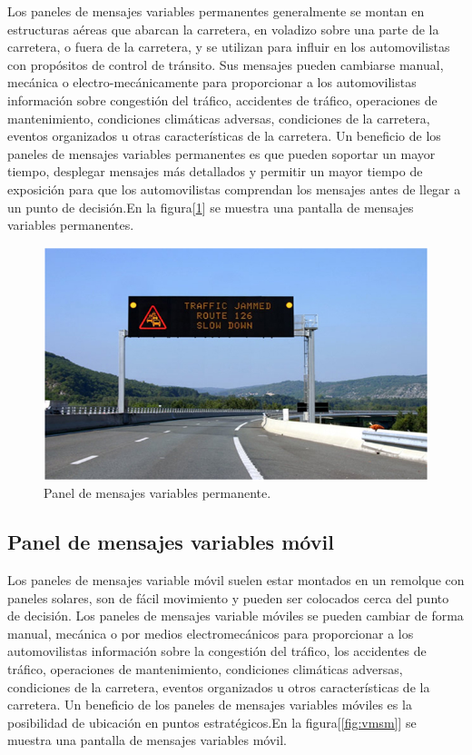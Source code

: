 Los paneles de mensajes variables permanentes generalmente se montan en estructuras aéreas que abarcan la carretera, en voladizo sobre una parte de la carretera, o fuera de la carretera, y se utilizan para influir en los automovilistas con propósitos de control de tránsito. Sus mensajes pueden cambiarse manual, mecánica o electro-mecánicamente para proporcionar a los automovilistas información sobre congestión del tráfico, accidentes de tráfico, operaciones de mantenimiento, condiciones climáticas adversas, condiciones de la carretera, eventos organizados u otras características de la carretera. Un beneficio de los paneles de mensajes variables permanentes es que pueden soportar un mayor tiempo, desplegar mensajes más detallados y permitir un mayor tiempo de exposición para que los automovilistas comprendan los mensajes antes de llegar a un punto de decisión.En la figura[\ref{fig:vmsp}] se muestra una pantalla de mensajes variables permanentes.


\begin{figure}[hptb]
	\centering
	\includegraphics[scale=0.6]{../Figures/vmspermanente.jpg} 
	\caption{Panel de mensajes variables permanente.}
	\label{fig:vmsp}
\end{figure}




\subsection{Panel de mensajes variables móvil}

Los paneles de mensajes variable móvil suelen estar montados en un remolque con paneles solares, son de fácil movimiento y pueden ser colocados cerca del punto de decisión. Los paneles de mensajes variable móviles se  pueden cambiar de forma manual, mecánica o por medios electromecánicos para proporcionar a los automovilistas información sobre la congestión del tráfico, los accidentes de tráfico, operaciones de mantenimiento, condiciones climáticas adversas, condiciones de la carretera, eventos organizados u otros características de la carretera. Un beneficio de los paneles de mensajes variables móviles es la posibilidad de ubicación en puntos estratégicos.En la figura[\ref{fig:vmsm}] se muestra una pantalla de mensajes variables móvil.

